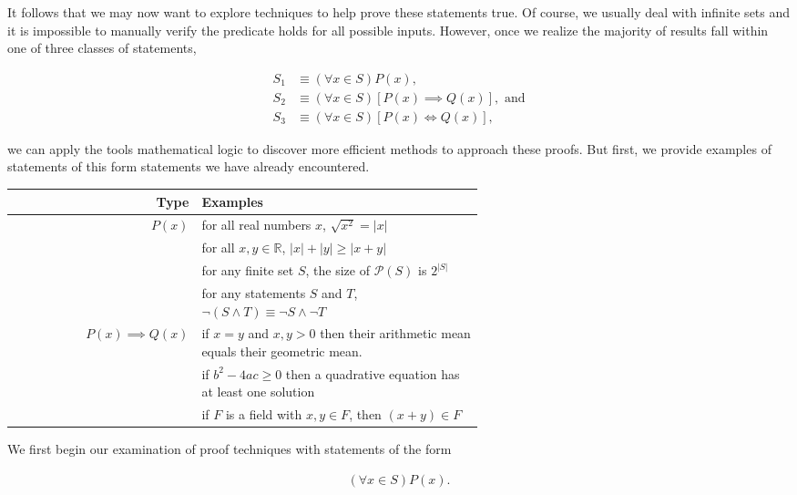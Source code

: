\documentclass[twoside]{report}
\begin{document}
It follows that we may now want to explore techniques to help prove these statements true. Of course, we usually deal with infinite sets and it is impossible to manually verify the predicate holds for all possible inputs. However, once we realize the majority of results fall within one of three classes of statements, 

\begin{align*}
	S_1 &\equiv (\forall x \in S)P(x), \\
	S_2 &\equiv (\forall x \in S)[P(x) \implies Q(x)], \text{ and} \\
	S_3 &\equiv (\forall x \in S)[P(x) \iff Q(x)],
\end{align*} 

we can apply the tools mathematical logic to discover more efficient methods to approach these proofs. But first, we provide examples of statements  of this form statements we have already encountered.

\vspace{\baselineskip}
\begin{center}
	\begin{tabular}{rp{0.6\linewidth}}
		\toprule
		Type & Examples \\
		\midrule
		$P(x)$ & for all real numbers $x$, $\sqrt{x^2} = |x|$ \\
		& for all $x, y \in \mathbb{R}$, $|x| + |y| \ge |x +y|$ \\
		& for any finite set $S$, the size of $\mathcal{P}(S)$ is $2^{|S|}$ \\
		& for any statements $S$ and $T$, $\neg(S \wedge T) \equiv \neg S \wedge \neg T $ \vspace{0.25\baselineskip} \\
		$P(x) \implies Q(x)$ & if $x = y$ and $x, y > 0$ then their arithmetic mean equals their geometric mean. \\
		& if $b^2 - 4ac \ge 0$ then a quadrative equation has at least one solution \\
		& if $F$ is a field with $x, y \in F$, then $(x + y) \in F$ \\
		\bottomrule
	\end{tabular}
\end{center}
\vspace{\baselineskip}

We first begin our examination of proof techniques with statements of the form

\begin{align*}
	(\forall x \in S)P(x).
\end{align*}
\end{document}
